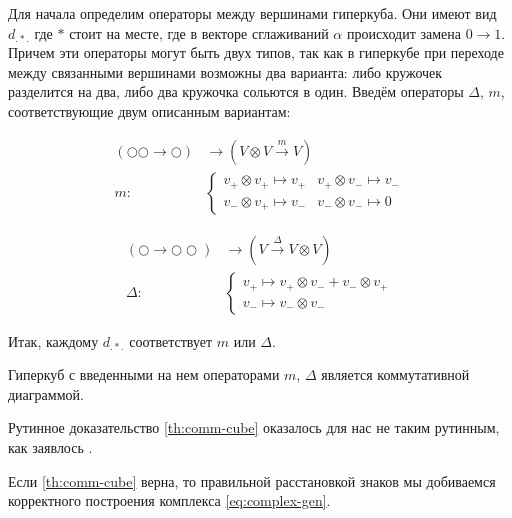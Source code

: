 \documentclass[a4paper,8pt]{extarticle}
\begin{document}
\begin{multicols}{2}
    Для начала определим операторы между вершинами гиперкуба.
    Они имеют вид $d_{. * .}$ где $*$ стоит на месте, где в векторе 
    сглаживаний $\alpha$ происходит замена $0 \rightarrow 1$. Причем
    эти операторы могут быть двух типов, так как
    в гиперкубе при переходе между связанными вершинами возможны два
    варианта: либо
    кружочек разделится на два, либо два кружочка сольются в один.
    Введём операторы $\Delta$, $m$, соответствующие двум описанным 
    вариантам:

    \begin{align}
    (\bigcirc \bigcirc \longrightarrow \bigcirc) &\longrightarrow (V \otimes V \overset{m}{\to} V) \nonumber \\
    m: &\begin{cases}
    v_+ \otimes v_+ \mapsto v_+ & v_+ \otimes v_- \mapsto v_- \\
    v_- \otimes v_+ \mapsto v_- & v_- \otimes v_- \mapsto 0
    \end{cases} \label{eq:m_complete}
    \end{align}

    \begin{align}
    (\bigcirc \longrightarrow \bigcirc \bigcirc) &\longrightarrow (V \overset{\Delta}{\to} V \otimes V) \nonumber \\
    \Delta: &\begin{cases}
    v_+ \mapsto v_+ \otimes v_- + v_- \otimes v_+ \\
    v_- \mapsto v_- \otimes v_-
    \end{cases} \label{eq:delta_complete}
    \end{align}

    Итак, каждому $d_{. * .}$ соответствует $m$ или $\Delta$.


    \begin{tcolorbox}
        \begin{theorem}
        Гиперкуб с введенными на нем операторами $m$, $\Delta$
        является коммутативной диаграммой.
        \label{th:comm-cube}
    \end{theorem}
    \end{tcolorbox}
    

    Рутинное доказательство \ref{th:comm-cube} оказалось для нас 
    не таким рутинным, как заявлось \parencite{bar-natan}.

    Если \ref{th:comm-cube} верна, то правильной расстановкой знаков
    мы добиваемся корректного построения комплекса \eqref{eq:complex-gen}.
    

\end{multicols}
\end{document}
